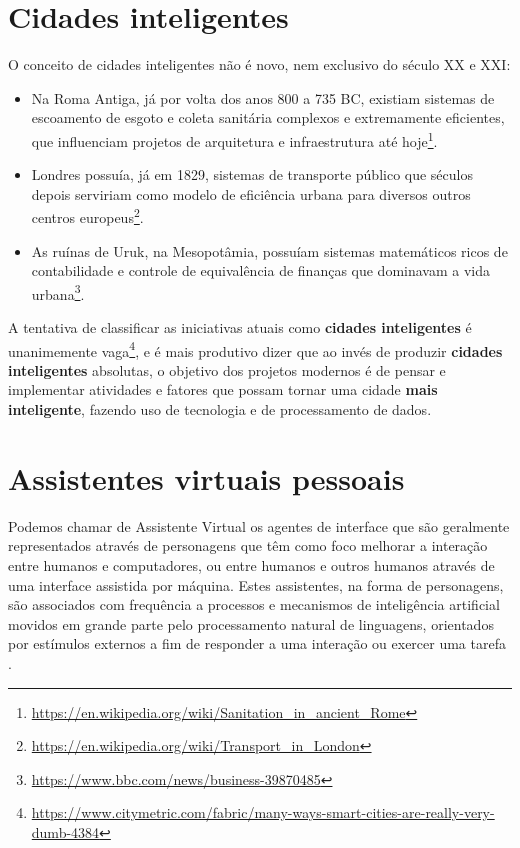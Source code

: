\section{Cidades inteligentes} \label{s:cidades_inteligentes}

O conceito de cidades inteligentes não é novo, nem exclusivo do século XX e XXI:

\begin{itemize}
    \item Na Roma Antiga, já por volta dos anos 800 a 735 BC, existiam sistemas de escoamento de esgoto e coleta sanitária complexos e extremamente eficientes, que influenciam projetos de arquitetura e infraestrutura até hoje\footnote{\url{https://en.wikipedia.org/wiki/Sanitation_in_ancient_Rome}}.
    
    \item Londres possuía, já em 1829, sistemas de transporte público que séculos depois serviriam como modelo de eficiência urbana para diversos outros centros europeus\footnote{\url{https://en.wikipedia.org/wiki/Transport_in_London}}.
    
    \item As ruínas de Uruk, na Mesopotâmia, possuíam sistemas matemáticos ricos de contabilidade e controle de equivalência de finanças que dominavam a vida urbana\footnote{\url{https://www.bbc.com/news/business-39870485}}.
\end{itemize}

A tentativa de classificar as iniciativas atuais como \textbf{cidades inteligentes} é unanimemente vaga\footnote{\url{https://www.citymetric.com/fabric/many-ways-smart-cities-are-really-very-dumb-4384}}, e é mais produtivo dizer que ao invés de produzir \textbf{cidades inteligentes} absolutas, o objetivo dos projetos modernos é de pensar e implementar atividades e fatores que possam tornar uma cidade \textbf{mais inteligente}, fazendo uso de tecnologia e de processamento de dados.

\section{Assistentes virtuais pessoais} \label{s:assistentes_virtuais_pessoais}

Podemos chamar de Assistente Virtual os agentes de interface que são geralmente representados através de personagens que têm como foco melhorar a interação entre humanos e computadores, ou entre humanos e outros humanos através de uma interface assistida por máquina. Estes assistentes, na forma de personagens, são associados com frequência a processos e mecanismos de inteligência artificial movidos em grande parte pelo processamento natural de linguagens, orientados por estímulos externos a fim de responder a uma interação ou exercer uma tarefa \cite{reategui2006agentes}.

